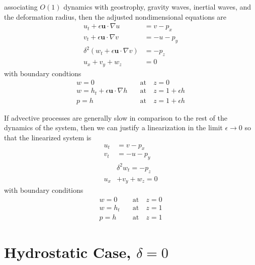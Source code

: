 \documentclass[letterpaper, 11pt]{article}
\begin{document}
associating $O(1)$ dynamics with geostrophy, gravity waves, inertial waves, and the deformation radius, then the adjusted nondimensional equations are
\begin{subequations}
\begin{align}
u_t + \epsilon \mathbf{u} \cdot \nabla u &= v - p_x \\
v_t + \epsilon \mathbf{u} \cdot \nabla v &= -u - p_y \\
\delta^2 \left( w_t + \epsilon \mathbf{u} \cdot \nabla v \right) &= -p_z \\
u_x + v_y + w_z &= 0
\end{align}
\end{subequations}
with boundary condtions
\begin{subequations}
\begin{align}
w = 0 &\quad \mathrm{at} \quad z = 0 \\
w = h_t + \epsilon \mathbf{u} \cdot \nabla h &\quad \mathrm{at} \quad z = 1 + \epsilon h \\
p = h &\quad \mathrm{at} \quad z = 1 + \epsilon h
\end{align}
\end{subequations}

If advective processes are generally slow in comparison to the rest of the dynamics of the system, then we can justify a linearization in the limit $\epsilon \rightarrow 0$ so that the linearized system is
\begin{subequations}
\begin{align}
u_t &= v - p_x \\
v_t &= -u - p_y \\
&\delta^2 w_t = -p_z \\
u_x &+ v_y + w_z = 0
\end{align}
\end{subequations}
with boundary conditions
\begin{subequations}
\begin{align}
w = 0 &\quad \mathrm{at} \quad z = 0 \\
w = h_t &\quad \mathrm{at} \quad z = 1 \\
p = h &\quad \mathrm{at} \quad z = 1
\end{align}
\end{subequations}

\section{Hydrostatic Case, $\delta = 0$}
\end{document}
